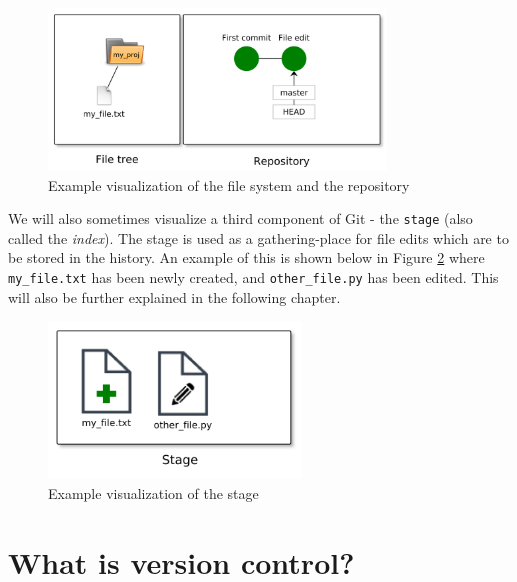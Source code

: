 \documentclass[../main/git_course_main.tex]{subfiles}
\begin{document}
\begin{figure}[h!]
	\centering
	\includegraphics[width=0.8\textwidth]{../visualizations/chapter1/c11_visualize_file_system_and_repository.pdf}
	\caption{Example visualization of the file system and the repository}
	\label{fig:visualize_files_and_repo}
\end{figure}

We will also sometimes visualize a third component of Git - the \verb$stage$ (also called the \textit{index}). The stage is used as a gathering-place for file edits which are to be stored in the history. An example of this is shown below in Figure \ref{fig:visualize_stage} where \verb$my_file.txt$ has been newly created, and \verb$other_file.py$ has been edited. This will also be further explained in the following chapter.

\begin{figure}[h!]
	\centering
	\includegraphics[width=0.6\textwidth]{../visualizations/chapter1/c12_demonstration_of_the_stage.pdf}
	\caption{Example visualization of the stage}
	\label{fig:visualize_stage}
\end{figure}

\section{What is version control?}


\end{document}

